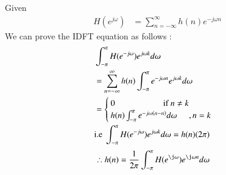 \documentclass[journal,12pt,twocolumn]{IEEEtran}
\renewcommand\thesection{\arabic{section}}
\begin{document}
\begin{enumerate}[label=\thesection.\arabic*]
\solution Given 
\begin{align}
	H(e^{j\omega}) &= \sum_{n=-\infty}^{\infty} h(n)e^{-j\omega n} 
\end{align}
We can prove the IDFT equation as follows :
\begin{align}
	&\int_{-\pi}^{\pi}H(e^{-j\omega})e^{j\omega k}d\omega \\
	&= \sum_{n=-\infty}^{\infty} h(n)\int_{-\pi}^{\pi} e^{-j\omega n}e^{j\omega k} d\omega \\
	   &= \begin{cases}
		0 \hspace{20mm} \text{if  } n \neq k\\
		 h(n)\int_{-\pi}^{\pi} e^{-j\omega (n - n)} d\omega \hspace{5mm}  {,n=k} \\
	  \end{cases} \\
	  &\text{i.e  } \int_{-\pi}^{\pi}H(e^{-j\omega})e^{j\omega k}d\omega = h(n)  (2\pi) 
\end{align}
\begin{align}
	\therefore h(n) &= \frac{1}{2\pi}\int_{-\pi}^{\pi}H(e^{\j\omega})e^{\j\omega n}d\omega 
\end{align}
\end{enumerate}
\end{document}
